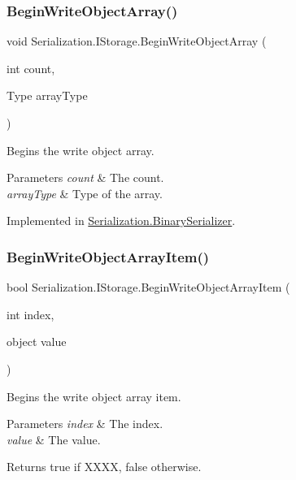 \subsubsection{\texorpdfstring{Begin\+Write\+Object\+Array()}{BeginWriteObjectArray()}}
{\footnotesize\ttfamily void Serialization.\+I\+Storage.\+Begin\+Write\+Object\+Array (\begin{DoxyParamCaption}\item[{int}]{count,  }\item[{Type}]{array\+Type }\end{DoxyParamCaption})}



Begins the write object array. 


\begin{DoxyParams}{Parameters}
{\em count} & The count.\\
\hline
{\em array\+Type} & Type of the array.\\
\hline
\end{DoxyParams}


Implemented in \hyperlink{class_serialization_1_1_binary_serializer_ab5c4d7c504b6766c9a1e7ee217ddfce6}{Serialization.\+Binary\+Serializer}.

\mbox{\label{interface_serialization_1_1_i_storage_a22a9b9ce868724387a5fe655089c08a7}} 
\subsubsection{\texorpdfstring{Begin\+Write\+Object\+Array\+Item()}{BeginWriteObjectArrayItem()}}
{\footnotesize\ttfamily bool Serialization.\+I\+Storage.\+Begin\+Write\+Object\+Array\+Item (\begin{DoxyParamCaption}\item[{int}]{index,  }\item[{object}]{value }\end{DoxyParamCaption})}



Begins the write object array item. 


\begin{DoxyParams}{Parameters}
{\em index} & The index.\\
\hline
{\em value} & The value.\\
\hline
\end{DoxyParams}
\begin{DoxyReturn}{Returns}
{\ttfamily true} if X\+X\+XX, {\ttfamily false} otherwise.
\end{DoxyReturn}


